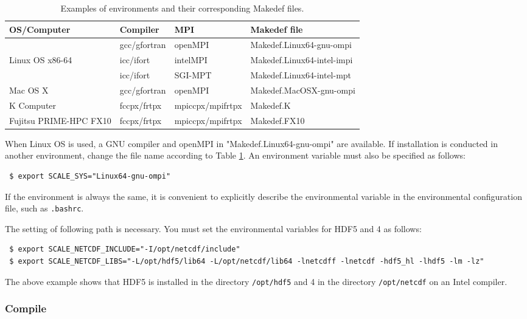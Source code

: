 \begin{table}[htb]
\begin{center}
\caption{Examples of environments and their corresponding Makedef files.}
\begin{tabularx}{150mm}{|l|l|X|l|} \hline
 \rowcolor[gray]{0.9} OS/Computer & Compiler & MPI & Makedef file \\ \hline
                 & gcc/gfortran & openMPI  & Makedef.Linux64-gnu-ompi \\ \cline{2-4}
 Linux OS x86-64 & icc/ifort    & intelMPI & Makedef.Linux64-intel-impi \\ \cline{2-4}
                 & icc/ifort    & SGI-MPT  & Makedef.Linux64-intel-mpt \\ \hline
 Mac OS X        & gcc/gfortran & openMPI  & Makedef.MacOSX-gnu-ompi \\ \hline
 K Computer      & fccpx/frtpx  & mpiccpx/mpifrtpx & Makedef.K \\ \hline
 Fujitsu PRIME-HPC FX10 & fccpx/frtpx & mpiccpx/mpifrtpx & Makedef.FX10 \\ \hline
\end{tabularx}
\label{tab:makedef}
\end{center}
\end{table}

When Linux OS is used, a GNU compiler and openMPI in "Makedef.Linux64-gnu-ompi" are available. If installation is conducted in another environment, change the file name according to Table \ref{tab:makedef}. An environment variable must also be specified as follows:
\begin{verbatim}
 $ export SCALE_SYS="Linux64-gnu-ompi"
\end{verbatim}
If the environment is always the same, it is convenient to explicitly describe the environmental variable in the environmental configuration file, such as \verb|.bashrc|.

The setting of following path is necessary. You must set the environmental variables for HDF5 and {\netcdf}4 as follows:
\begin{verbatim}
 $ export SCALE_NETCDF_INCLUDE="-I/opt/netcdf/include"
 $ export SCALE_NETCDF_LIBS="-L/opt/hdf5/lib64 -L/opt/netcdf/lib64 -lnetcdff -lnetcdf -hdf5_hl -lhdf5 -lm -lz"
\end{verbatim}
The above example shows that
HDF5 is installed in the directory \verb|/opt/hdf5|
and {\netcdf}4 in the directory \verb|/opt/netcdf|
on an Intel compiler.

\subsubsection{Compile} %

